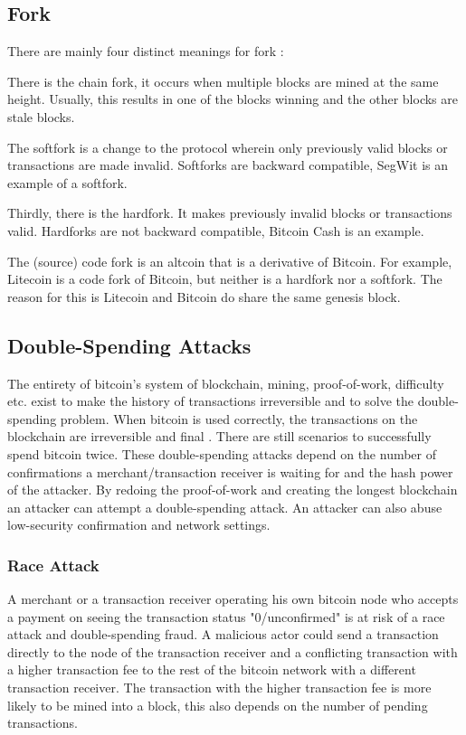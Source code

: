 \subsection{Fork}
There are mainly four distinct meanings for fork \cite{Fork}:

There is the chain fork, it occurs when multiple blocks are mined at the same height. Usually, this results in one of the blocks winning and the other blocks are stale blocks.

The softfork is a change to the protocol wherein only previously valid blocks or transactions are made invalid. Softforks are backward compatible, SegWit is an example of a softfork.

Thirdly, there is the hardfork. It makes previously invalid blocks or transactions valid. Hardforks are not backward compatible, Bitcoin Cash is an example.

The (source) code fork is an altcoin that is a derivative of Bitcoin. For example, Litecoin is a code fork of Bitcoin, but neither is a hardfork nor a softfork. The reason for this is Litecoin and Bitcoin do share the same genesis block.

\subsection{Double-Spending Attacks\label{subsection:background:alternativhistoryattack}}
The entirety of bitcoin's system of blockchain, mining, proof-of-work, difficulty etc. exist to make the history of transactions irreversible and to solve the double-spending problem. When bitcoin is used correctly, the transactions on the blockchain are irreversible and final \cite{irreversibletransactions}. There are still scenarios to successfully spend bitcoin twice. These double-spending attacks depend on the number of confirmations a merchant/transaction receiver is waiting for and the hash power of the attacker. By redoing the proof-of-work and creating the longest blockchain an attacker can attempt a double-spending attack. An attacker can also abuse low-security confirmation and network settings.

\subsubsection{Race Attack\label{subsubsection:raceAttack}}
A merchant or a transaction receiver operating his own bitcoin node who accepts a payment on seeing the transaction status "0/unconfirmed" is at risk of a race attack and double-spending fraud. A malicious actor could send a transaction directly to the node of the transaction receiver and a conflicting transaction with a higher transaction fee to the rest of the bitcoin network with a different transaction receiver. The transaction with the higher transaction fee is more likely to be mined into a block, this also depends on the number of pending transactions.

